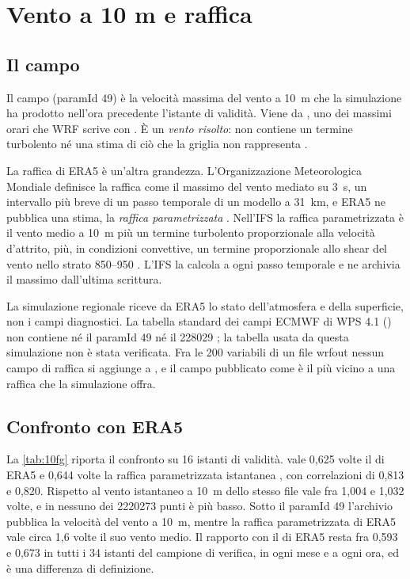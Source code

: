 \chapter{Vento a 10 m e raffica}
\label{cap:raffica}

\section{Il campo \texorpdfstring{}{10fg}}
\label{sec:10fg}

Il campo  (paramId 49) è la velocità massima del vento a \SI{10}{m} che la simulazione
ha prodotto nell'ora precedente l'istante di validità. Viene da , uno dei massimi
orari che WRF scrive con . È un \emph{vento risolto}: non contiene un
termine turbolento né una stima di ciò che la griglia non rappresenta \parencite{issue50}.

La raffica di ERA5 è un'altra grandezza. L'Organizzazione Meteorologica Mondiale definisce la
raffica come il massimo del vento mediato su \SI{3}{s}, un intervallo più breve di un passo temporale
di un modello a \SI{31}{km}, e ERA5 ne pubblica una stima, la \emph{raffica parametrizzata}
\parencite{paramdb}. Nell'IFS la raffica parametrizzata è il vento medio a \SI{10}{m} più un termine
turbolento proporzionale alla velocità d'attrito, più, in condizioni convettive, un termine
proporzionale allo shear del vento nello strato \SIrange{850}{950}{\hPa} \parencite[sez.~3.10.4,
eq.~3.99]{ifs41r2p4}. L'IFS la calcola a ogni passo temporale e ne archivia il massimo dall'ultima
scrittura.

La simulazione regionale riceve da ERA5 lo stato dell'atmosfera e della superficie, non i campi
diagnostici. La tabella standard dei campi ECMWF di WPS 4.1 () non contiene né il
paramId 49 né il 228029 \parencite{wps41}; la tabella usata da questa simulazione non è stata
verificata. Fra le 200 variabili di un file wrfout nessun campo di raffica si aggiunge a
, e il campo pubblicato come  è il più vicino a una raffica che la
simulazione offra.

\section{Confronto con ERA5}
\label{sec:10fg-era5}

La \cref{tab:10fg} riporta il confronto su 16 istanti di validità.  vale 0,625 volte il
 di ERA5 e 0,644 volte la raffica parametrizzata istantanea , con
correlazioni di 0,813 e 0,820. Rispetto al vento istantaneo a \SI{10}{m} dello stesso file vale fra
1,004 e 1,032 volte, e in nessuno dei \num{2220273} punti è più basso. Sotto il paramId 49
l'archivio pubblica la velocità del vento a \SI{10}{m}, mentre la raffica parametrizzata di ERA5 vale
circa 1,6 volte il suo vento medio. Il rapporto con il  di ERA5 resta fra 0,593 e 0,673 in
tutti i 34 istanti del campione di verifica, in ogni mese e a ogni ora, ed è una
differenza di definizione.

